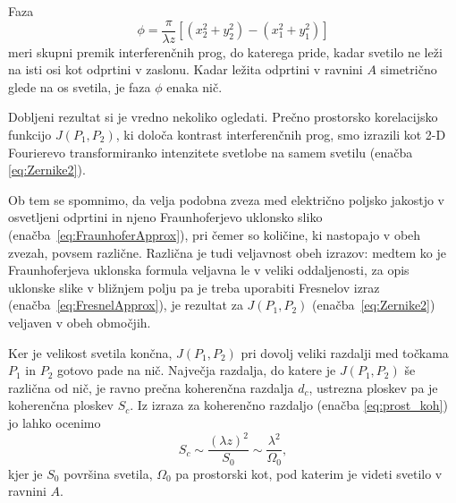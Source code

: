 Faza 
\begin{equation}
\phi=\frac{\pi}{\lambda z}[(x_{2}^{2}+y_{2}^{2})-(x_{1}^{2}+y_{1}^{2})]
\end{equation}
meri skupni premik interferenčnih prog, do katerega pride, kadar svetilo
ne leži na isti osi kot odprtini v zaslonu. Kadar ležita odprtini v ravnini $A$ 
simetrično glede na os svetila, je faza $\phi$ enaka nič.

Dobljeni rezultat si je vredno nekoliko ogledati. Prečno prostorsko
korelacijsko funkcijo $J(P_{1},P_{2})$, ki določa kontrast interferenčnih
prog, smo izrazili kot 2-D  Fourierevo transformiranko intenzitete svetlobe
na samem svetilu (enačba \ref{eq:Zernike2}). 
\begin{remark}
Ob tem se spomnimo,
da velja podobna zveza med električno poljsko jakostjo v osvetljeni odprtini 
in njeno Fraunhoferjevo uklonsko sliko (enačba~\ref{eq:FraunhoferApprox}), 
pri čemer so količine, ki nastopajo v obeh zvezah,
povsem različne. Različna je tudi veljavnost obeh izrazov: medtem ko je Fraunhoferjeva
uklonska formula veljavna le v veliki oddaljenosti, za opis uklonske slike v bližnjem polju
pa je treba uporabiti Fresnelov izraz (enačba~\ref{eq:FresnelApprox}), 
je rezultat za $J(P_{1},P_{2})$ (enačba~\ref{eq:Zernike2}) veljaven v obeh območjih.
\end{remark}

Ker je velikost svetila končna, $J(P_{1},P_{2})$ pri dovolj veliki
razdalji med točkama $P_{1}$ in $P_{2}$ gotovo pade na nič. Največja
razdalja, do katere je $J(P_{1},P_{2})$ še različna od nič, je ravno
prečna koherenčna razdalja $d_{c}$, ustrezna ploskev pa je koherenčna
ploskev $S_{c}$. Iz izraza za koherenčno razdaljo 
(enačba \ref{eq:prost_koh}) jo lahko ocenimo
\begin{equation}
S_{c}\sim\frac{(\lambda z)^{2}}{S_{0}}\sim\frac{\lambda^{2}}{\Omega_{0}},
\label{eq:koherencna-ploskev}
\end{equation}
kjer je $S_{0}$ površina svetila, $\Omega_{0}$ pa prostorski kot,
pod katerim je videti svetilo v ravnini $A$. 

